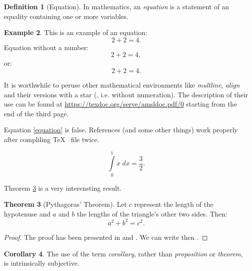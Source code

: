 \documentclass[a4paper,11pt,twoside]{report}
\theoremstyle{definition}
\newtheorem{theorem}{Theorem}[chapter]
\newtheorem{example}[theorem]{Example}
\newtheorem{corollary}[theorem]{Corollary}
\newtheorem{definition}[theorem]{Definition}
\begin{document}
\begin{definition}[Equation]
	In mathematics, an \emph{equation} is a statement of an equality containing one or more variables.
\end{definition}
%
\begin{example}
This is an example of an equation:
\begin{equation}
	2+2=4.
\end{equation}
%
Equation without a number:
\begin{equation*}
	2+2=4,
\end{equation*}
or:
\[
2+2=4.
\]

It is worthwhile to peruse other mathematical environments like  \emph{multline}, \emph{align} and their versions with a star (, i.e. without numeration). The description of their use can be found at  \url{https://texdoc.org/serve/amsldoc.pdf/0} starting from the end of the third page.

Equation \eqref{equation} is false. References (and some other things) work properly after compliling \TeX ~ file twice.

\begin{equation}\label{equation}
	\int \limits_{0}^{1} x \; dx = \frac{3}{2}.
\end{equation}

\end{example}

Theorem \ref{Pitagoras} is a very interensting result.

\begin{theorem}[Pythagoras' Theorem]\label{Pitagoras}
	Let $c$ represent the length of the hypotenuse and $a$ and $b$ the lengths of the triangle's other two sides. Then:
\begin{equation*}
	a^2 + b^2 = c^2.
\end{equation*}
%
\end{theorem}

\begin{proof}
	The proof has been presented in \cite{Ktos} and \cite{Innyktos}. We can write then \cite{Ktos, Innyktos}.
\end{proof}

\begin{corollary}
	The use of the term \emph{corollary}, rather than \emph{proposition} or \emph{theorem}, is intrinsically subjective.
\end{corollary}
\end{document}
